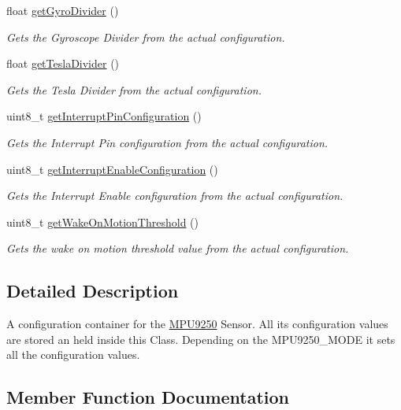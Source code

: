 \begin{DoxyCompactItemize}
float \hyperlink{class_m_p_u9250_config_a48972e2b2c25f49b09ab93545b93c6fc}{get\+Gyro\+Divider} ()
\begin{DoxyCompactList}\small\item\em Gets the Gyroscope Divider from the actual configuration. \end{DoxyCompactList}\item 
float \hyperlink{class_m_p_u9250_config_aa1c46724a1248e37105ea5f1b8618502}{get\+Tesla\+Divider} ()
\begin{DoxyCompactList}\small\item\em Gets the Tesla Divider from the actual configuration. \end{DoxyCompactList}\item 
uint8\+\_\+t \hyperlink{class_m_p_u9250_config_af0598b9002b2df077766ac16d874dd1a}{get\+Interrupt\+Pin\+Configuration} ()
\begin{DoxyCompactList}\small\item\em Gets the Interrupt Pin configuration from the actual configuration. \end{DoxyCompactList}\item 
uint8\+\_\+t \hyperlink{class_m_p_u9250_config_ac04b30207ffcc0e7757749700a08c601}{get\+Interrupt\+Enable\+Configuration} ()
\begin{DoxyCompactList}\small\item\em Gets the Interrupt Enable configuration from the actual configuration. \end{DoxyCompactList}\item 
uint8\+\_\+t \hyperlink{class_m_p_u9250_config_a39d8fafe27bac98087979ce181eac676}{get\+Wake\+On\+Motion\+Threshold} ()
\begin{DoxyCompactList}\small\item\em Gets the wake on motion threshold value from the actual configuration. \end{DoxyCompactList}\end{DoxyCompactItemize}


\subsection{Detailed Description}
A configuration container for the \hyperlink{class_m_p_u9250}{M\+P\+U9250} Sensor. All its configuration values are stored an held inside this Class. Depending on the M\+P\+U9250\+\_\+\+M\+O\+D\+E it sets all the configuration values. 

\subsection{Member Function Documentation}
\hypertarget{class_m_p_u9250_config_a3c2cf2621f92829e9c70179f87a91af9}{}
